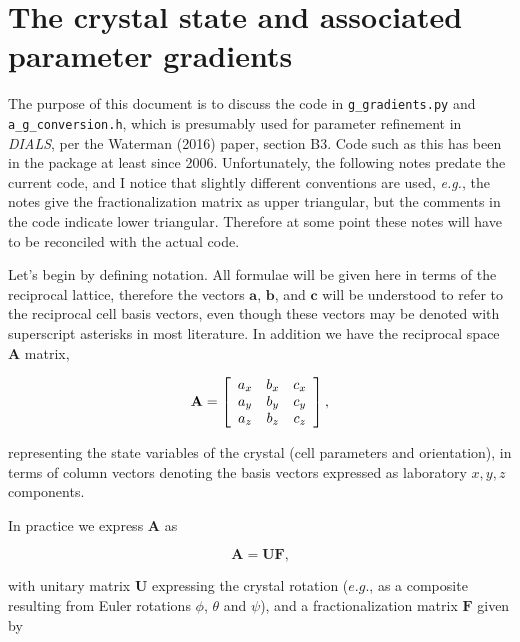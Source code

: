 \documentclass[12pt, letterpaper]{article}
\begin{document}

\section{The crystal state and associated parameter gradients}
  The purpose of this document is to discuss the code in \texttt{g\_gradients.py} and \texttt{a\_g\_conversion.h}, which is presumably used for parameter refinement in \textit{DIALS}, per the Waterman (2016) paper, section B3.  Code such as this has been in the package at least since 2006.  Unfortunately, the following notes predate the current code, and I notice that slightly different conventions are used, \textit{e.g.}, the notes give the fractionalization matrix as upper triangular, but the comments in the code indicate lower triangular.  Therefore at some point these notes will have to be reconciled with the actual code.

Let's begin by defining notation.  All formulae will be given here in terms of the reciprocal lattice, therefore the vectors $\mathbf{a}$, $\mathbf{b}$, and $\mathbf{c}$ will be understood to refer to the reciprocal cell basis vectors, even though these vectors may be denoted with superscript asterisks in most literature.  In addition we have the reciprocal space $\mathbf{A}$ matrix,

  \begin{equation}
    \mathbf{A} = 
    \left[
    \begin{array}{c c c}
       a_{x}  & b_{x} & c_{x} \\
       a_{y}  & b_{y} & c_{y} \\
       a_{z}  & b_{z} & c_{z} \\
    \end{array}
    \right]
    \text{,}
    \label{eqn:expansion}
  \end{equation}

representing the state variables of the crystal (cell parameters and orientation), in terms of column vectors denoting the basis vectors expressed as laboratory $x,y,z$ components.

In practice we express $\mathbf{A}$ as

  \begin{equation}
      \mathbf{A} = \mathbf{UF} 
    \text{,}
    \label{eqn:sabbrev}
  \end{equation}


with unitary matrix $\mathbf{U}$ expressing the crystal rotation ($e.g.$, as a composite resulting from Euler rotations $\phi$, $\theta$ and $\psi$), and a fractionalization matrix $\mathbf{F}$ given by  
\end{document}

